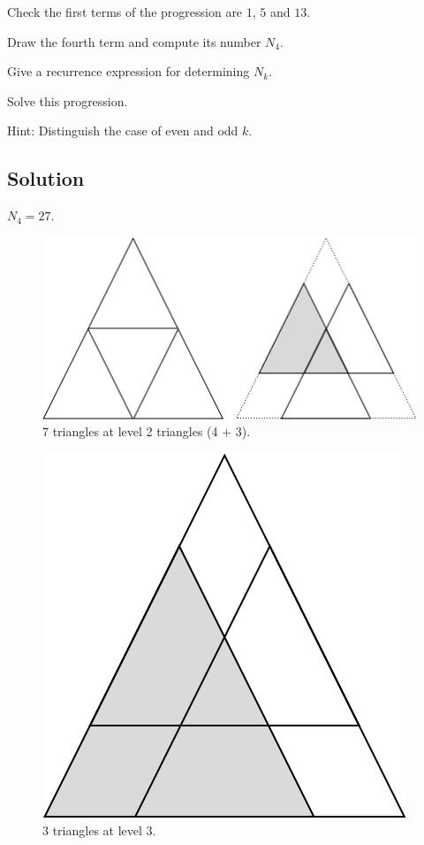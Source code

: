 \documentclass{article}[12pt]
\begin{document}
Check the first terms of the progression are $1$, $5$ and $13$.

Draw the fourth term and compute its number $N_4$.

Give a recurrence expression for determining $N_k$.

Solve this progression. 

Hint: Distinguish the case of even and odd $k$.

\subsection{Solution}

$N_4 = 27$.

\begin{figure}[h]
\begin{center}
        \includegraphics[scale=0.3]{FiguresArithmetic/CountingTriangles2} 
        \caption{7 triangles at level 2 triangles (4 + 3).}
        \label{fig:countingTriangles2}
\end{center}
\end{figure}
\begin{figure}[h]
\begin{center}
        \includegraphics[scale=0.3]{FiguresArithmetic/CountingTriangles3} 
        \caption{3 triangles at level 3.}
        \label{fig:countingTriangles3}
\end{center}
\end{figure}
\bigskip
\end{document}
